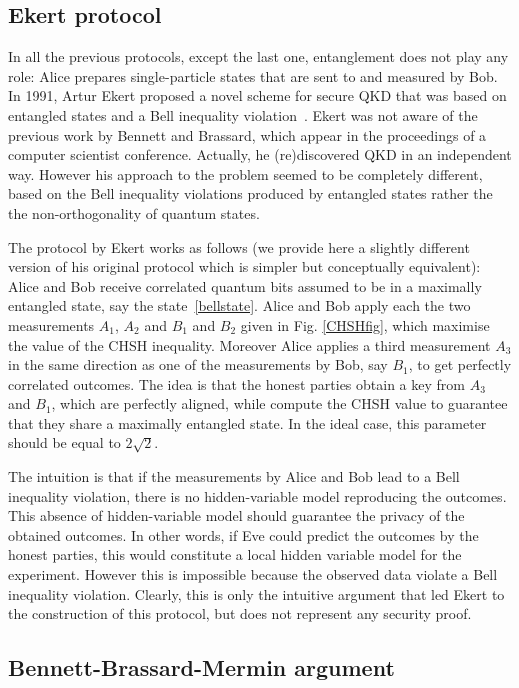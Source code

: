 \documentclass[a4paper]{article}
\begin{document}
\subsection{Ekert protocol}

In all the previous protocols, except the last one, entanglement
does not play any role: Alice prepares single-particle states
that are sent to and measured by Bob. In 1991, Artur Ekert proposed
a novel scheme for secure QKD that was based on entangled states
and a Bell inequality violation~\cite{Ekert}. Ekert was not aware of
the previous work by Bennett and Brassard, which appear in the
proceedings of a computer scientist conference. Actually, he
(re)discovered QKD in an independent way. However his approach to
the problem seemed to be completely different, based on the
Bell inequality violations produced by entangled states rather the the
non-orthogonality of quantum states.

The protocol by Ekert works as follows (we provide here a slightly
different version of his original protocol which is simpler but
conceptually equivalent): Alice and Bob receive correlated quantum
bits assumed to be in a maximally entangled state, say the state~\eqref{bellstate}. 
Alice and Bob apply each the two measurements $A_1$,
$A_2$ and $B_1$ and $B_2$ given in Fig. \ref{CHSHfig}, which
maximise the value of the CHSH inequality. Moreover Alice applies
a third measurement $A_3$ in the same direction as one of the
measurements by Bob, say $B_1$, to get perfectly correlated
outcomes. The idea is that the honest parties obtain a key from
$A_3$ and $B_1$, which are perfectly aligned, while compute the
CHSH value to guarantee that they share a maximally entangled state. In the ideal
case, this parameter should be equal to $2\sqrt 2$.

The intuition is that if the measurements by Alice and Bob lead to
a Bell inequality violation, there is no hidden-variable model
reproducing the outcomes. This absence of hidden-variable model
should guarantee the privacy of the obtained outcomes. In other
words, if Eve could predict the outcomes by the honest parties,
this would constitute a local hidden variable model for the
experiment. However this is impossible because the observed data
violate a Bell inequality violation. Clearly, this is only the
intuitive argument that led Ekert to the construction of this
protocol, but does not represent any security proof. 

\subsection{Bennett-Brassard-Mermin argument}
\end{document}
